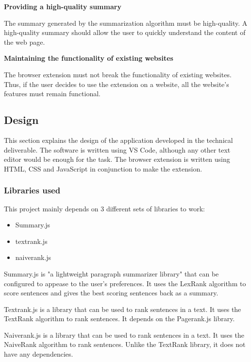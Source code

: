 \documentclass[conference,compsoc]{IEEEtran}
\begin{document}
\vspace{0.4cm}
\textbf{Providing a high-quality summary}

The summary generated by the summarization algorithm must be high-quality.
A high-quality summary should allow the user to quickly understand the content of the web page.


\vspace{0.4cm}
\textbf{Maintaining the functionality of existing websites}

The browser extension must not break the functionality of existing websites.
Thus, if the user decides to use the extension on a website, all the website's features must remain functional.



\subsection{Design}


This section explains the design of the application developed in the technical deliverable.
The software is written using VS Code, although any other text editor would be enough for the task.
The browser extension is written using HTML, CSS and JavaScript in conjunction to make the extension.

\subsubsection{Libraries used}
This project mainly depends on 3 different sets of libraries to work:
\begin{itemize}
  \item Summary.js
  \item textrank.js
  \item naiverank.js
\end{itemize}


Summary.js is "a lightweight paragraph summarizer library" that can be configured to appease to the user's preferences.
It uses the LexRank algorithm to score sentences and gives the best scoring sentences back as a summary.

Textrank.js is a library that can be used to rank sentences in a text. It uses the TextRank algorithm to rank sentences.
It depends on the Pagerank.js library.


Naiverank.js is a library that can be used to rank sentences in a text. It uses the NaiveRank algorithm to rank sentences.
Unlike the TextRank library, it does not have any dependencies.
\end{document}
